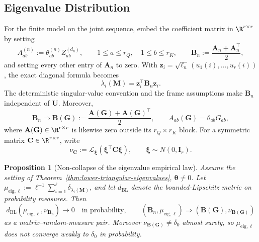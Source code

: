 \documentclass{article}
\newcommand{\weak}{\Rightarrow}
\newcommand{\bA}{\mathbf{A}}
\newcommand{\bB}{\mathbf{B}}
\newcommand{\bC}{\mathbf{C}}
\newcommand{\bM}{\mathbf{M}}
\newcommand{\bU}{\mathbf{U}}
\newcommand{\bG}{\mathbf{G}}
\newtheorem{proposition}[theorem]{Proposition}
\theoremstyle{definition}
\theoremstyle{remark}
\begin{document}
\subsection{Eigenvalue Distribution}
\label{lr:eigenvalue-details}

For the finite model on the joint sequence, embed the coefficient matrix in
$\R^{r\times r}$ by setting
\begin{equation}
    A_{ab}^{(n)}
    :=
    \theta_{ab}^{(n)}Z_{ab}^{(d_n)},
    \qquad
    1\leq a\leq r_Q,\quad 1\leq b\leq r_K,
    \qquad
    \bB_n:=\frac{\bA_n+\bA_n^\top}{2},
    \label{eq:finite-eigenvalue-coefficient-matrix}
\end{equation}
and setting every other entry of $\bA_n$ to zero.  With
$\mathbf z_i=\sqrt{\ell_n}\,(u_1(i),\ldots,u_r(i))$, the exact diagonal formula
becomes
\begin{equation}
    \lambda_i(\bM)=\mathbf z_i^\top\bB_n\mathbf z_i.
    \label{eq:finite-eigenvalue-quadratic-form}
\end{equation}
The deterministic singular-value convention and the frame assumptions make
$\bB_n$ independent of $\bU$.  Moreover,
\begin{equation}
    \bB_n\weak\bB(\bG)
    :=\frac{\bA(\bG)+\bA(\bG)^\top}{2},
    \qquad
    A_{ab}(\bG)=\theta_{ab}G_{ab},
    \label{eq:finite-coefficient-matrix-limit}
\end{equation}
where $\bA(\bG)\in\R^{r\times r}$ is likewise zero outside its
$r_Q\times r_K$ block.  For a symmetric matrix $\bC\in\R^{r\times r}$, write
\[
    \nu_{\bC}:=\mathcal L_{\boldsymbol{\xi}}
    (\boldsymbol{\xi}^\top\bC\boldsymbol{\xi}),
    \qquad \boldsymbol{\xi}\sim N(0,\mathbf I_r).
\]

\begin{proposition}[Non-collapse of the eigenvalue empirical law]
Assume the setting of Theorem~\ref{thm:lower-triangular-eigenvalues},
$\boldsymbol{\theta}\neq0$.  Let
$\mu_{\mathrm{eig},\ell}:=\ell^{-1}\sum_{i=1}^{\ell}
\delta_{\lambda_i(\bM)}$, and let $d_{\mathrm{BL}}$ denote the bounded-Lipschitz
metric on probability measures.  Then
\begin{equation}
    d_{\mathrm{BL}}\!\left(\mu_{\mathrm{eig},\ell},\nu_{\bB_n}\right)
    \longrightarrow 0
    \quad\text{in probability},
    \qquad
    (\bB_n,\mu_{\mathrm{eig},\ell})
    \weak
    (\bB(\bG),\nu_{\bB(\bG)})
    \label{eq:noncollapsed-esd-limit}
\end{equation}
as a matrix--random-measure pair.  Moreover
$\nu_{\bB(\bG)}\neq\delta_0$ almost surely, so
$\mu_{\mathrm{eig},\ell}$ does not converge weakly to $\delta_0$ in
probability.
\label{prop:eigenvalue-esd-noncollapse}
\end{proposition}
\end{document}
